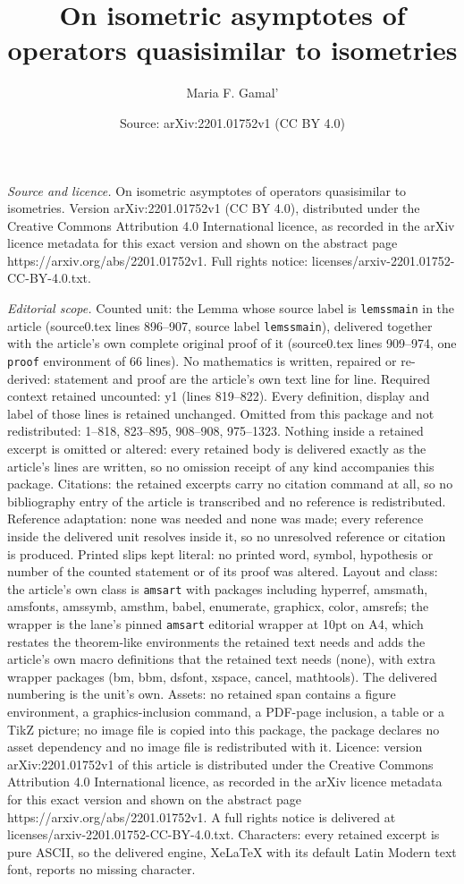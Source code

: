 \documentclass[10pt,a4paper]{amsart}
\title[On isometric asymptotes of operators quasisimilar to isometr]{On isometric asymptotes of operators quasisimilar to isometries}
\author{Maria F. Gamal'}
\date{Source: arXiv:2201.01752v1 (CC BY 4.0)}
\begin{document}
\maketitle

\noindent\emph{Source and licence.} On isometric asymptotes of operators quasisimilar to isometries. Version arXiv:2201.01752v1 (CC BY 4.0), distributed under the Creative Commons Attribution 4.0 International licence, as recorded in the arXiv licence metadata for this exact version and shown on the abstract page https://arxiv.org/abs/2201.01752v1. Full rights notice: licenses/arxiv-2201.01752-CC-BY-4.0.txt.\par\smallskip

\noindent\textit{Editorial scope.} Counted unit: the Lemma whose source label is \texttt{lemssmain} in the article (source0.tex lines 896--907, source label \texttt{lemssmain}), delivered together with the article's own complete original proof of it (source0.tex lines 909--974, one \texttt{proof} environment of 66 lines). No mathematics is written, repaired or re-derived: statement and proof are the article's own text line for line. Required context retained uncounted: y1 (lines 819--822). Every definition, display and label of those lines is retained unchanged. Omitted from this package and not redistributed: 1--818, 823--895, 908--908, 975--1323. Nothing inside a retained excerpt is omitted or altered: every retained body is delivered exactly as the article's lines are written, so no omission receipt of any kind accompanies this package. Citations: the retained excerpts carry no citation command at all, so no bibliography entry of the article is transcribed and no reference is redistributed. Reference adaptation: none was needed and none was made; every reference inside the delivered unit resolves inside it, so no unresolved reference or citation is produced. Printed slips kept literal: no printed word, symbol, hypothesis or number of the counted statement or of its proof was altered. Layout and class: the article's own class is \texttt{amsart} with packages including hyperref, amsmath, amsfonts, amssymb, amsthm, babel, enumerate, graphicx, color, amsrefs; the wrapper is the lane's pinned \texttt{amsart} editorial wrapper at 10pt on A4, which restates the theorem-like environments the retained text needs and adds the article's own macro definitions that the retained text needs (none), with extra wrapper packages (bm, bbm, dsfont, xspace, cancel, mathtools). The delivered numbering is the unit's own. Assets: no retained span contains a figure environment, a graphics-inclusion command, a PDF-page inclusion, a table or a TikZ picture; no image file is copied into this package, the package declares no asset dependency and no image file is redistributed with it. Licence: version arXiv:2201.01752v1 of this article is distributed under the Creative Commons Attribution 4.0 International licence, as recorded in the arXiv licence metadata for this exact version and shown on the abstract page https://arxiv.org/abs/2201.01752v1. A full rights notice is delivered at licenses/arxiv-2201.01752-CC-BY-4.0.txt. Characters: every retained excerpt is pure ASCII, so the delivered engine, XeLaTeX with its default Latin Modern text font, reports no missing character.
\end{document}
